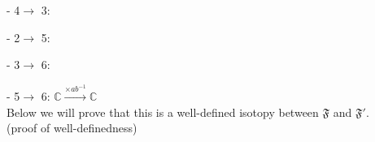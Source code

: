 - 4$\rightarrow$ 3: 

- 2$\rightarrow$ 5: 

- 3$\rightarrow$ 6: 

- 5$\rightarrow$ 6: $\mathbb{C}\xrightarrow{\times ab^{-1}}\mathbb{C}$\\

Below we will prove that this is a well-defined isotopy between $\mathfrak{F}$ and $\mathfrak{F}'$.\\

(proof of well-definedness)